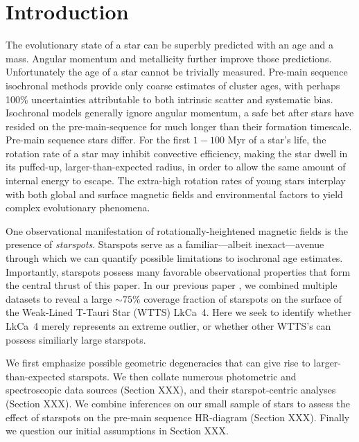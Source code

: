 \documentclass[twocolumn]{emulateapj}%
\begin{document}
\maketitle

\section{Introduction}\label{sec:intro}

The evolutionary state of a star can be superbly predicted with an age and a mass.  Angular momentum and metallicity further improve those predictions.  Unfortunately the age of a star cannot be trivially measured.  Pre-main sequence isochronal methods provide only coarse estimates of cluster ages, with perhaps 100\% uncertainties attributable to both intrinsic scatter and systematic bias.  Isochronal models generally ignore angular momentum, a safe bet after stars have resided on the pre-main-sequence for much longer than their formation timescale.  Pre-main sequence stars differ.  For the first $1-100$ Myr of a star's life, the rotation rate of a star may inhibit convective efficiency, making the star dwell in its puffed-up, larger-than-expected radius, in order to allow the same amount of internal energy to escape.  The extra-high rotation rates of young stars interplay with both global and surface magnetic fields and environmental factors to yield complex evolutionary phenomena.

One observational manifestation of rotationally-heightened magnetic fields is the presence of \emph{starspots}.  Starspots serve as a familiar---albeit inexact---avenue through which we can quantify possible limitations to isochronal age estimates.  Importantly, starspots possess many favorable observational properties that form the central thrust of this paper.  In our previous paper \citep{2017ApJ...836..200G}, we combined multiple datasets to reveal a large $\sim75\%$ coverage fraction of starspots on the surface of the Weak-Lined T-Tauri Star (WTTS) LkCa~4.  Here we seek to identify whether LkCa~4 merely represents an extreme outlier, or whether other WTTS's can possess similiarly large starspots.


We first emphasize possible geometric degeneracies that can give rise to larger-than-expected starspots.  We then collate numerous photometric and spectroscopic data sources (Section XXX), and their starspot-centric analyses (Section XXX).  We combine inferences on our small sample of stars to assess the effect of starspots on the pre-main sequence HR-diagram (Section XXX).  Finally we question our initial assumptions in Section XXX.
\end{document}
